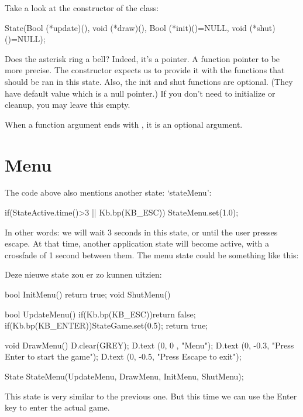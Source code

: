 Take a look at the constructor of the  class:

\begin{code}
State(Bool (*update)(), void (*draw)(), Bool (*init)()=NULL, void (*shut)()=NULL); 
\end{code}

Does the asterisk ring a bell? Indeed, it's a pointer. A function pointer to be more precise. The constructor expects us to provide it with the functions that should be ran in this state. Also, the init and shut functions are optional. (They have default value which is a null pointer.) If you don't need to initialize or cleanup, you may leave this empty.

\begin{note}
When a function argument ends with , it is an optional argument.
\end{note} 

\section{Menu}
The code above also mentions another state: `stateMenu':

\begin{code}
   if(StateActive.time()>3 || Kb.bp(KB_ESC)) {
      StateMenu.set(1.0);                    
   }
\end{code}

In other words: we will wait 3 seconds in this state, or until the user presses escape. At that time, another application state will become active, with a crossfade of 1 second between them. The menu state could be something like this:

Deze nieuwe state zou er zo kunnen uitzien:
\begin{code}
bool InitMenu() {return true;}
void ShutMenu() {}

bool UpdateMenu()
{
   if(Kb.bp(KB_ESC))return false;
   if(Kb.bp(KB_ENTER))StateGame.set(0.5);
   return true;
}

void DrawMenu()
{
   D.clear(GREY);
   D.text (0,  0  , "Menu");
   D.text (0, -0.3, "Press Enter to start the game");
   D.text (0, -0.5, "Press Escape to exit");
}

State StateMenu(UpdateMenu, DrawMenu, InitMenu, ShutMenu);
\end{code}

This state is very similar to the previous one. But this time we can use the Enter key to enter the actual game. 

